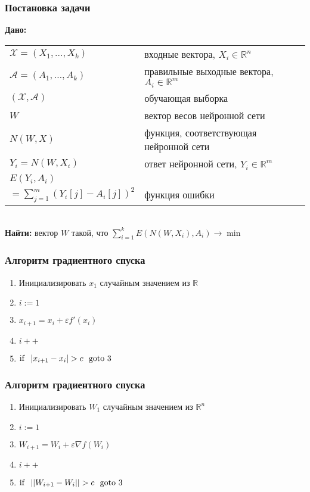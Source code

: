 \documentclass[24pt,pdf,hyperref={unicode}]{beamer}
\begin{document}
\begin{frame}\frametitle{Постановка задачи}
{\bf Дано:}
\begin{tabular}{p{4cm} p{6cm}}
 $\mathcal{X}=(X_1,\ldots,X_k)$ & входные вектора, $X_i\in\mathbb{R}^n$\\[0.1cm]
 $\mathcal{A}=(A_1,\ldots,A_k)$ & правильные выходные вектора, $A_i\in\mathbb{R}^m$\\[0.1cm]
 $(\mathcal{X},\mathcal{A})$ & обучающая выборка  \\[0.1cm]
 $W$ & вектор весов нейронной сети \\[0.1cm]
 $N(W,X)$ & функция, соответствующая нейронной сети \\[0.1cm]
 $Y_i=N(W,X_i)$ & ответ нейронной сети, $Y_i\in\mathbb{R}^m$ \\[0.1cm]
$E(Y_i,A_i)$ & \\
$=\sum_{j=1}^{m} (Y_i[j]-A_i[j])^2 $ & функция ошибки \\
 \end{tabular}\\[1cm]
{\bf Найти:}
вектор $W$ такой, что $\sum_{i=1}^k E(N(W,X_i),A_i)\rightarrow \min$
\end{frame}




\begin{frame}\frametitle{Алгоритм градиентного спуска}
\begin{enumerate}
 \item Инициализировать $x_1$ случайным значением из $\mathbb{R}$
 \item $i:=1$
 \item $x_{i+1}=x_i+\varepsilon f'(x_i)$
 \item $i++$
 \item ${\rm if}\ \ |x_{i+1}-x_i|>c\ \ {\rm goto}\ 3$
\end{enumerate}
\end{frame}

\begin{frame}\frametitle{Алгоритм градиентного спуска}
\begin{enumerate}
 \item Инициализировать $W_1$ случайным значением из $\mathbb{R}^n$
 \item $i:=1$
 \item $W_{i+1}=W_i+\varepsilon \nabla f(W_i)$
 \item $i++$
 \item ${\rm if}\ \ ||W_{i+1}-W_i||>c\ \ {\rm goto}\ 3$
\end{enumerate}
\end{frame}
\end{document}

